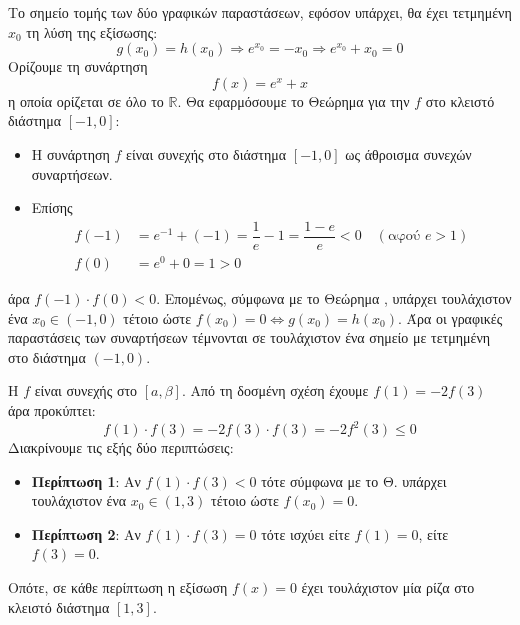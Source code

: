 \lysh
Το σημείο τομής των δύο γραφικών παραστάσεων, εφόσον υπάρχει, θα έχει τετμημένη $x_0$ τη λύση της εξίσωσης:
\[ g(x_0) = h(x_0) \Rightarrow e^{x_0} = -x_0 \Rightarrow e^{x_0} + x_0 = 0 \]
Ορίζουμε τη συνάρτηση
\[ f(x) = e^x + x \]
η οποία ορίζεται σε όλο το $\mathbb{R}$. Θα εφαρμόσουμε το Θεώρημα  για την $f$ στο κλειστό διάστημα $[-1, 0]$:
\begin{itemize}
    \item Η συνάρτηση $f$ είναι συνεχής στο διάστημα $[-1, 0]$ ως άθροισμα συνεχών συναρτήσεων.
    \item Επίσης
    \begin{align*}
        f(-1) &= e^{-1} + (-1) = \dfrac{1}{e} - 1 = \dfrac{1-e}{e} < 0 \quad (\text{αφού } e > 1) \\
        f(0) &= e^0 + 0 = 1 > 0
    \end{align*}
\end{itemize}
άρα $f(-1) \cdot f(0) < 0$. Επομένως, σύμφωνα με το Θεώρημα , υπάρχει τουλάχιστον ένα $x_0 \in (-1, 0)$ τέτοιο ώστε $f(x_0) = 0\Leftrightarrow g(x_0) = h(x_0)$. 
Άρα οι γραφικές παραστάσεις των συναρτήσεων τέμνονται σε τουλάχιστον ένα σημείο με τετμημένη στο διάστημα $(-1, 0)$.\\


\lysh
Η $f$ είναι συνεχής στο $[a,\beta]$. Από τη δοσμένη σχέση έχουμε $f(1) = -2f(3)$ άρα προκύπτει:
\[ f(1) \cdot f(3) = -2f(3) \cdot f(3) = -2f^2(3)\le 0 \]
Διακρίνουμε τις εξής δύο περιπτώσεις:
\begin{itemize}
    \item \textbf{Περίπτωση 1}: Αν ${f(1) \cdot f(3) < 0}$ τότε σύμφωνα με το Θ.  υπάρχει τουλάχιστον ένα $x_0 \in (1, 3)$ τέτοιο ώστε $f(x_0) = 0$.
    
    \item \textbf{Περίπτωση 2}: Αν ${f(1) \cdot f(3) = 0}$ τότε ισχύει είτε $f(1) = 0$, είτε $f(3) = 0$.
\end{itemize}
Οπότε, σε κάθε περίπτωση η εξίσωση $f(x) = 0$ έχει τουλάχιστον μία ρίζα στο κλειστό διάστημα $[1, 3]$.\\


